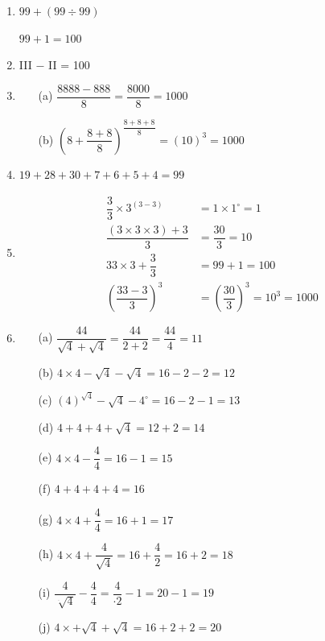 \begin{enumerate}
\item $99 + (99\div 99)$

$99 + 1 = 100$

\item III $-$ II = 100

\item 
\begin{itemize}
\item[(a)] $\dfrac{8888 - 888}{8} = \dfrac{8000}{8} = 1000$
\item[(b)] $\left(8 + \dfrac{8+8}{8}\right)^{\dfrac{8+8+8}{8}} = (10)^{3} = 1000$
\end{itemize}

\item $19+28+30+7+6+5+4 = 99$

\item 
\begin{align*}
\dfrac{3}{3} \times 3^{(3-3)} & = 1\times 1^{\circ} = 1\\
\dfrac{(3\times 3\times 3) + 3}{3} & = \dfrac{30}{3} = 10\\
33\times 3 + \dfrac{3}{3} & = 99 + 1 = 100\\
\left(\dfrac{33-3}{3}\right)^{3} & = \left(\dfrac{30}{3}\right)^{3} = 10^{3} = 1000
\end{align*}

\item 
\begin{itemize}
\item[(a)] $\dfrac{44}{\sqrt{4} + \sqrt{4}} = \dfrac{44}{2+2} = \dfrac{44}{4} = 11$
\item[(b)] $4\times 4 - \sqrt{4} - \sqrt{4} = 16 - 2 - 2 = 12$
\item[(c)] $(4)^{\sqrt{4}} - \sqrt{4} - 4^{\circ} = 16 - 2 - 1 = 13$
\item[(d)] $4 + 4 + 4 + \sqrt{4} = 12 + 2 = 14$
\item[(e)] $4\times 4 - \dfrac{4}{4} = 16 - 1 = 15$
\item[(f)] $4+4+4+4 = 16$
\item[(g)] $4\times 4 + \dfrac{4}{4} = 16 + 1 = 17$
\item[(h)] $4\times 4 + \dfrac{4}{\sqrt{4}} = 16 + \dfrac{4}{2} = 16 + 2 = 18$
\item[(i)] $\dfrac{4}{\sqrt[\cdot]{4}} - \dfrac{4}{4} = \dfrac{4}{\cdot 2} - 1 = 20 - 1 = 19$
\item[(j)] $4\times + \sqrt{4} + \sqrt{4} = 16 + 2 + 2 = 20$
\end{itemize}


\end{enumerate}
